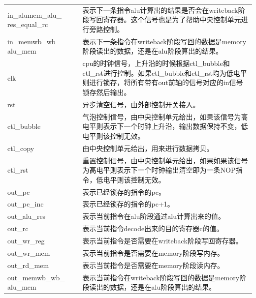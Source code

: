 \begin{center}
\begin{longtable}{p{}p{}}
        
        in\_alumem\_alu\_  res\_equal\_rc & 表示下一条指令alu计算出的结果是否会在writeback阶段写回寄存器。这个信号也是为了帮助中央控制单元进行旁路控制。\\
        in\_memwb\_wb\_  alu\_mem & 表示下一条指令在writeback阶段写回的数据是memory阶段读出的数据，还是在alu阶段算出的结果。\\
        clk & cpu的时钟信号，上升沿的时候根据ctl\_bubble和ctl\_rst进行控制。如果ctl\_bubble和ctl\_rst均为低电平则进行锁存，将所有带有out前轴的信号对应的in信号锁存然后输出。\\
        rst & 异步清空信号，由外部控制开关接入。\\
        ctl\_bubble &  气泡控制信号，由中央控制单元给出，如果该信号为高电平则表示下一个时钟上升沿，输出数据保持不变，低电平则该控制无效。\\
        ctl\_copy &  由中央控制单元给出，用来进行数据拷贝。\\
        ctl\_rst &  重置控制信号，由中央控制单元给出，如果如果该信号为高电平则表示下一个时钟输出清空即为一条NOP指令，低电平则该控制无效。\\
        out\_pc &  表示已经锁存的指令的pc。\\
        out\_pc\_inc &  表示已经锁存的指令的pc+1。\\
        out\_alu\_res & 表示当前指令在alu阶段通过alu计算出来的值。\\
        out\_rc & 表示当前指令decode出来的目的寄存器c的值。\\
        out\_wr\_reg &  表示当前指令是否需要在writeback阶段写回寄存器。\\
        out\_wr\_mem &  表示当前指令是否需要在memory阶段写内存。\\
        out\_rd\_mem &  表示当前指令是否需要在memory阶段读内存。\\
        out\_memwb\_wb\_  alu\_mem & 表示当前指令在writeback阶段写回的数据是memory阶段读出的数据，还是在alu阶段算出的结果。\\
        \bottomrule
    \end{longtable}
\end{center}

